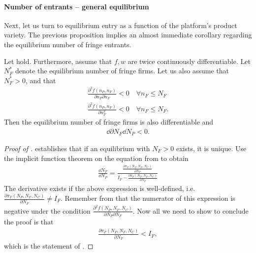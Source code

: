 \paragraph{Number of entrants -- general equilibrium}
Next, let us turn to equilibrium entry as a function of the platform's product variety.
The previous proposition implies an almost immediate corollary regarding the equilibrium number of fringe entrants.
\begin{corollary}
    \label{cor:fringe_entry}
    Let  hold.
    Furthermore, assume that $f, w$ are twice continuously differentiable.
    Let $N_F^*$ denote the equilibrium number of fringe firms.
    Let us also assume that $N_F^* > 0$, and that
    \begin{align*}
        \frac{\partial^2 f(n_P, n_F)}{\partial n_P \partial n_F} < 0 \quad \forall n_F \leq N_F \\
        \frac{\partial^2 f(n_P, n_F)}{\partial n_F^2} < 0 \quad \forall n_F \leq N_F.
    \end{align*}
    Then the equilibrium number of fringe firms is also differentiable and
    \begin{align*}
        \dd{\partial N_F}{\dd N_P} < 0.
    \end{align*}
\end{corollary}
\begin{proof}[Proof of ]
     establishes that if an equilibrium with $N_F > 0$ exists, it is unique.
    Use the implicit function theorem on the equation from  to obtain
    \begin{align*}
        \frac{\dd N_F}{\dd N_P} = \frac{\frac{\partial \pi_F(N_P, N_F, N_C)}{\partial N_P}}{I_F - \frac{\partial \pi_F (N_P, N_F, N_C)}{\partial N_F}}
    \end{align*}
    The derivative exists if the above expression is well-defined, i.e. $\frac{\partial \pi_F (N_P, N_F, N_C)}{\partial N_F} \neq I_F$.
    Remember from  that the numerator of this expression is negative under the condition $\frac{\partial^2 f(N_P, N_F, N_C)}{\partial N_P \partial N_F}$.
    Now all we need to show to conclude the proof is that
    \begin{align*}
        \frac{\partial \pi_F (N_P, N_F, N_C)}{\partial N_F} < I_F,
    \end{align*}
    which is the statement of .
\end{proof}

